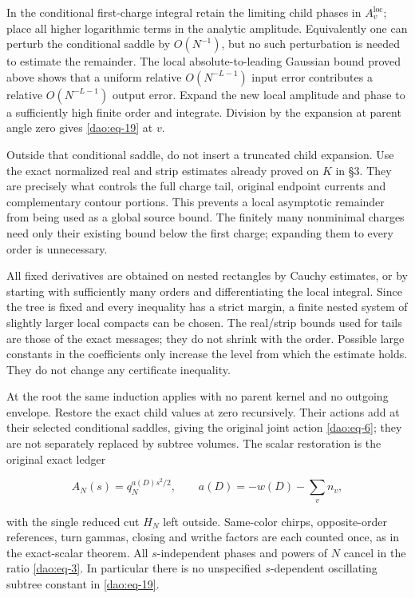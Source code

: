 In the conditional first-charge integral retain the limiting child phases in \(A_v^{\mathrm{loc}}\); place all higher logarithmic terms in the analytic amplitude. Equivalently one can perturb the conditional saddle by \(O(N^{-1})\), but no such perturbation is needed to estimate the remainder. The local absolute-to-leading Gaussian bound proved above shows that a uniform relative \(O(N^{-L-1})\) input error contributes a relative \(O(N^{-L-1})\) output error. Expand the new local amplitude and phase to a sufficiently high finite order and integrate. Division by the expansion at parent angle zero gives \eqref{dao:eq-19} at \(v\).

Outside that conditional saddle, do not insert a truncated child expansion. Use the exact normalized real and strip estimates already proved on \(K\) in §3. They are precisely what controls the full charge tail, original endpoint currents and complementary contour portions. This prevents a local asymptotic remainder from being used as a global source bound. The finitely many nonminimal charges need only their existing bound below the first charge; expanding them to every order is unnecessary.

All fixed derivatives are obtained on nested rectangles by Cauchy estimates, or by starting with sufficiently many orders and differentiating the local integral. Since the tree is fixed and every inequality has a strict margin, a finite nested system of slightly larger local compacts can be chosen. The real/strip bounds used for tails are those of the exact messages; they do not shrink with the order. Possible large constants in the coefficients only increase the level from which the estimate holds. They do not change any certificate inequality.

At the root the same induction applies with no parent kernel and no outgoing envelope. Restore the exact child values at zero recursively. Their actions add at their selected conditional saddles, giving the original joint action \eqref{dao:eq-6}; they are not separately replaced by subtree volumes. The scalar restoration is the original exact ledger

\begin{equation}\label{dao:eq-20}
A_N(s)=q_N^{a(D)s^2/2},\qquad a(D)=-w(D)-\sum_v n_v,
\end{equation}

with the single reduced cut \(H_N\) left outside. Same-color chirps, opposite-order references, turn gammas, closing and writhe factors are each counted once, as in the exact-scalar theorem. All \(s\)-independent phases and powers of \(N\) cancel in the ratio \eqref{dao:eq-3}. In particular there is no unspecified \(s\)-dependent oscillating subtree constant in \eqref{dao:eq-19}.

